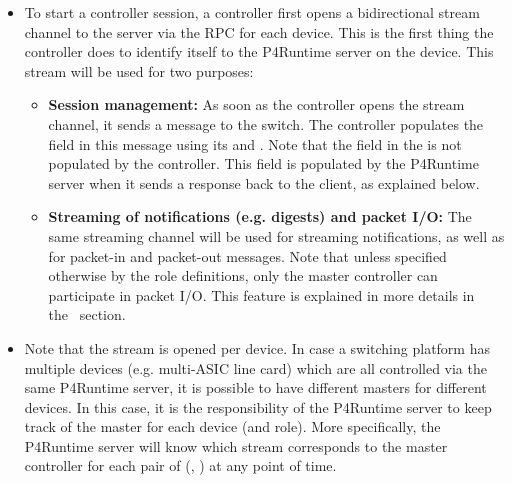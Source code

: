 \documentclass[11pt]{article}
\begin{document}
{\begin{itemize}
\item{}
To start a controller session, a controller first opens a bidirectional stream
channel to the server via the  RPC for each device. This is the
first thing the controller does to identify itself to the P4Runtime server on
the device. This stream will be used for two purposes:%

\begin{itemize}%

\item{}
\textbf{Session management:} As soon as the controller opens the stream
channel, it sends a  message to the switch. The
controller populates the  field in this message
using its  and . Note that the  field in the
 is not populated by the controller. This field
is populated by the P4Runtime server when it sends a response back to the
client, as explained below.%

\item{}
\textbf{Streaming of notifications (e.g. digests) and packet I/O:} The same
streaming channel will be used for streaming notifications, as well as for
packet-in and packet-out messages. Note that unless specified otherwise by
the role definitions, only the master controller can participate in packet
I/O. This feature is explained in more details in the~ section.%
\end{itemize}%

\item{}
Note that the stream is opened per device. In case a switching platform has
multiple devices (e.g. multi-ASIC line card) which are all controlled via the
same P4Runtime server, it is possible to have different masters for different
devices. In this case, it is the responsibility of the P4Runtime server to
keep track of the master for each device (and role). More specifically, the
P4Runtime server will know which stream corresponds to the master controller
for each pair of (, ) at any point of time.%


\end{itemize}}
\end{document}

